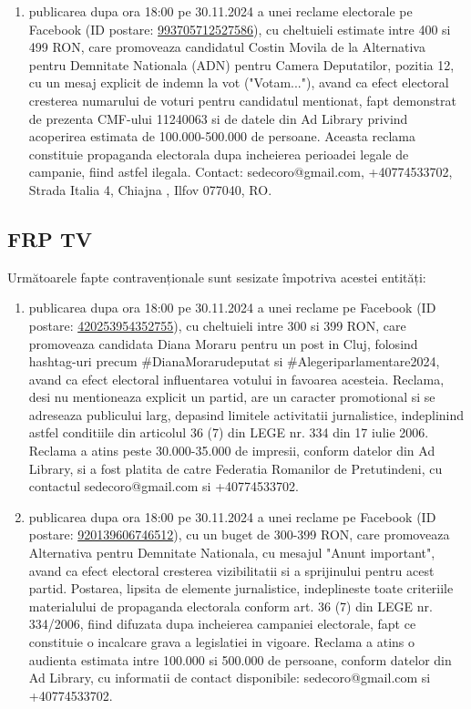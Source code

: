 \documentclass[a4paper,12pt]{article}
\begin{document}
\begin{enumerate}[leftmargin=*, label=\arabic*.)]
    \item publicarea dupa ora 18:00 pe 30.11.2024 a unei reclame electorale pe Facebook (ID postare: \href{https://www.facebook.com/ads/library/?id=993705712527586}{993705712527586}), cu cheltuieli estimate intre 400 si 499 RON, care promoveaza candidatul Costin Movila de la Alternativa pentru Demnitate Nationala (ADN) pentru Camera Deputatilor, pozitia 12, cu un mesaj explicit de indemn la vot ("Votam..."), avand ca efect electoral cresterea numarului de voturi pentru candidatul mentionat, fapt demonstrat de prezenta CMF-ului 11240063 si de datele din Ad Library privind acoperirea estimata de 100.000-500.000 de persoane.  Aceasta reclama constituie propaganda electorala dupa incheierea perioadei legale de campanie, fiind astfel ilegala. Contact: sedecoro@gmail.com, +40774533702, Strada Italia 4, Chiajna , Ilfov 077040, RO.
\end{enumerate}

\vspace{0.5cm}

\subsection{FRP TV}
Următoarele fapte contravenționale sunt sesizate împotriva acestei entități:

\begin{enumerate}[leftmargin=*, label=\arabic*.)]
    \item publicarea dupa ora 18:00 pe 30.11.2024 a unei reclame pe Facebook (ID postare: \href{https://www.facebook.com/ads/library/?id=420253954352755}{420253954352755}), cu cheltuieli intre 300 si 399 RON, care promoveaza candidata Diana Moraru pentru un post in Cluj, folosind hashtag-uri precum \#DianaMorarudeputat si \#Alegeriparlamentare2024, avand ca efect electoral influentarea votului in favoarea acesteia.  Reclama, desi nu mentioneaza explicit un partid, are un caracter promotional si se adreseaza publicului larg, depasind limitele activitatii jurnalistice, indeplinind astfel conditiile din articolul 36 (7) din LEGE nr. 334 din 17 iulie 2006.  Reclama a atins peste 30.000-35.000 de impresii, conform datelor din Ad Library, si a fost platita de catre Federatia Romanilor de Pretutindeni, cu contactul sedecoro@gmail.com si +40774533702.
    \item publicarea dupa ora 18:00 pe 30.11.2024 a unei reclame pe Facebook (ID postare: \href{https://www.facebook.com/ads/library/?id=920139606746512}{920139606746512}), cu un buget de 300-399 RON, care promoveaza Alternativa pentru Demnitate Nationala, cu mesajul "Anunt important", avand ca efect electoral cresterea vizibilitatii si a sprijinului pentru acest partid.  Postarea, lipsita de elemente jurnalistice, indeplineste toate criteriile materialului de propaganda electorala conform art. 36 (7) din LEGE nr. 334/2006, fiind difuzata dupa incheierea campaniei electorale, fapt ce constituie o incalcare grava a legislatiei in vigoare.  Reclama a atins o audienta estimata intre 100.000 si 500.000 de persoane, conform datelor din Ad Library, cu informatii de contact disponibile: sedecoro@gmail.com si +40774533702.
\end{enumerate}
\end{document}
